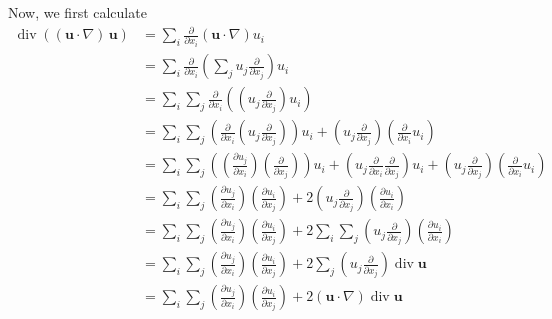 Now, we first calculate
\begin{equation}
\begin{aligned}
\operatorname{div}\left((\textbf{u}\cdot \nabla)\, \textbf{u}\right)
&= \sum_{i} \frac{\partial}{\partial x_i}\left(\textbf{u}\cdot \nabla\right) u_i\\
&= \sum_{i} \frac{\partial}{\partial x_i}\left(\sum_{j}u_j\frac{\partial}{\partial x_j}\right) u_i\\
&= \sum_{i}\sum_{j}\frac{\partial}{\partial x_i}\left(\left(u_j\frac{\partial}{\partial x_j}\right) u_i\right)\\
&= \sum_{i}\sum_{j}
\left(\frac{\partial}{\partial x_i}\left(u_j\frac{\partial}{\partial x_j}\right)\right) u_i
+\left(u_j\frac{\partial}{\partial x_j}\right)\left(\frac{\partial}{\partial x_i} u_i\right)\\
&= \sum_{i}\sum_{j}
\left(\left(\frac{\partial u_j}{\partial x_i}\right)\left(\frac{\partial}{\partial x_j}\right)\right) u_i
+\left(u_j\frac{\partial}{\partial x_i}\frac{\partial}{\partial x_j}\right) u_i
+\left(u_j\frac{\partial}{\partial x_j}\right)\left(\frac{\partial}{\partial x_i} u_i\right)\\
&= \sum_{i}\sum_{j}
\left(\frac{\partial u_j}{\partial x_i}\right)\left(\frac{\partial u_i}{\partial x_j}\right)
+2\left(u_j\frac{\partial}{\partial x_j}\right)\left(\frac{\partial u_i}{\partial x_i}\right)\\
&= \sum_{i}\sum_{j}
\left(\frac{\partial u_j}{\partial x_i}\right)\left(\frac{\partial u_i}{\partial x_j}\right)
+2\sum_{i}\sum_{j}\left(u_j\frac{\partial}{\partial x_j}\right)\left(\frac{\partial u_i}{\partial x_i}\right)\\
&= \sum_{i}\sum_{j}
\left(\frac{\partial u_j}{\partial x_i}\right)\left(\frac{\partial u_i}{\partial x_j}\right)
+2\sum_{j} \left(u_j\frac{\partial}{\partial x_j}\right)\operatorname{div}\textbf{u}\\
&= \sum_{i}\sum_{j}
\left(\frac{\partial u_j}{\partial x_i}\right)\left(\frac{\partial u_i}{\partial x_j}\right)
+2\left(\textbf{u}\cdot \nabla\right)\operatorname{div}\textbf{u}\\
\end{aligned}
\end{equation}


